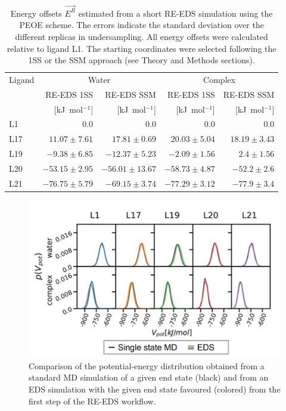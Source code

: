 \begin{table}[h]
\caption{Energy offsets $\vec{E^R}$ estimated from a short RE-EDS simulation using the PEOE \cite{Sidler2016} scheme. The errors indicate the standard deviation over the different replicas in undersampling. All energy offsets were calculated relative to ligand L1. The starting coordinates were selected following the 1SS or the SSM approach (see Theory and Methods sections).}
\label{tab:CHK1_set2_Eoff}
\centering
\begin{adjustbox}{max width=\textwidth}
\begin{tabular}{ l | r r | r r }
 Ligand & \multicolumn{2}{c|}{Water}&\multicolumn{2}{c}{Complex}  \\ 
  &RE-EDS 1SS &RE-EDS SSM &RE-EDS 1SS &RE-EDS SSM \\ 
  & [kJ~mol$^{-1}$]& [kJ~mol$^{-1}$]& [kJ~mol$^{-1}$]& [kJ~mol$^{-1}$]\\
 \hline
     L1 & $0.0$ & $0.0$ & $0.0$ & $0.0$ \\ 
     L17 & $11.07 \pm 7.61 $ & $17.81 \pm 0.69 $ & $20.03 \pm 5.04 $ & $18.19 \pm 3.43$ \\
     L19 & $-9.38 \pm 6.85 $ & $ -12.37 \pm 5.23 $ & $-2.09 \pm 1.56 $ & $ 2.4 \pm 1.56$ \\
     L20 & $-53.15 \pm 2.95 $ & $ -56.01 \pm 13.67 $ & $ -58.73 \pm 4.87 $ & $-52.2 \pm 2.6$\\
     L21 & $-76.75 \pm 5.79 $& $-69.15 \pm 3.74 $ & $ -77.29 \pm 3.12 $ & $ -77.9 \pm 3.4$\\
\end{tabular}
\end{adjustbox}
\end{table}

\begin{figure}[H]
\centering
     \includegraphics[width=\textwidth]{fig/results/ringOpening/paramExploration/single_state_energy_sampling.png}
    \caption{Comparison of the potential-energy distribution obtained from a standard MD simulation of a given end state (black) and from an EDS simulation with the given end state favoured (colored) from the first step of the RE-EDS workflow.}
     \label{fig:CHK1_set2_stateOptimization_EnergyDistribution}
\end{figure}



